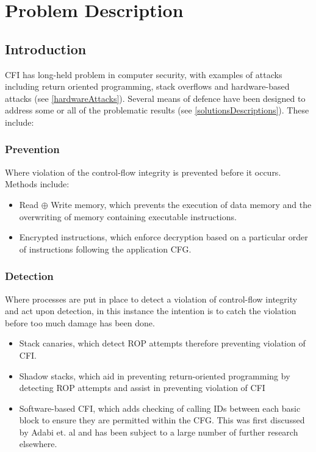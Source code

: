 \section{Problem Description}
\subsection{Introduction}

CFI has long-held problem in computer security, with examples of attacks including return oriented programming, stack overflows and hardware-based attacks (see \ref{hardwareAttacks}). Several means of defence have been designed to address some or all of the problematic results (see \ref{solutionsDescriptions}). These include:

\subsubsection{Prevention}
Where violation of the control-flow integrity is prevented before it occurs. Methods include:
\begin{itemize}
	\item Read $\oplus$ Write memory, which prevents the execution of data memory and the overwriting of memory containing executable instructions.
	\item Encrypted instructions, which enforce decryption based on a particular order of instructions following the application CFG.
\end{itemize}

\subsubsection{Detection}
Where processes are put in place to detect a violation of control-flow integrity and act upon detection, in this instance the intention is to catch the violation before too much damage has been done.
\begin{itemize}
	\item Stack canaries, which detect ROP attempts therefore preventing violation of CFI.
	\item Shadow stacks, which aid in preventing return-oriented programming by detecting ROP attempts and assist in preventing violation of CFI
	\item Software-based CFI, which adds checking of calling IDs between each basic block to ensure they are permitted within the CFG. This was first discussed by Adabi et. al \cite{Abadi2005} and has been subject to a large number of further research elsewhere.
\end{itemize}

